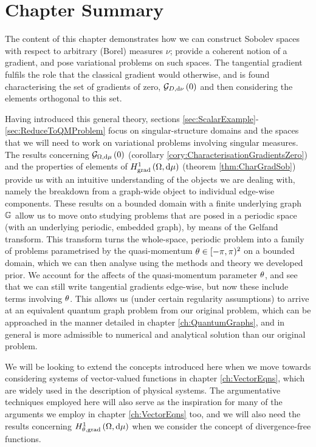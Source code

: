 \section{Chapter Summary}
The content of this chapter demonstrates how we can construct Sobolev spaces with respect to arbitrary (Borel) measures $\nu$; provide a coherent notion of a gradient, and pose variational problems on such spaces.
The tangential gradient fulfils the role that the classical gradient would otherwise, and is found characterising the set of gradients of zero, $\mathcal{G}_{ D, \mathrm{d}\nu}\left( 0 \right)$ and then considering the elements orthogonal to this set. \newline

Having introduced this general theory, sections \ref{sec:ScalarExample}-\ref{sec:ReduceToQMProblem} focus on singular-structure domains and the spaces that we will need to work on variational problems involving singular measures.
The results concerning $\mathcal{G}_{ \Omega, \mathrm{d}\mu}\left( 0 \right)$ (corollary \ref{cory:CharacterisationGradientsZero}) and the properties of elements of $H^1_\mathrm{grad}\left( \Omega, \mathrm{d}\mu \right)$ (theorem \ref{thm:CharGradSob}) provide us with an intuitive understanding of the objects we are dealing with, namely the breakdown from a graph-wide object to individual edge-wise components.
These results on a bounded domain with a finite underlying graph $\mathbb{G}$ allow us to move onto studying problems that are posed in a periodic space (with an underlying periodic, embedded graph), by means of the Gelfand transform.
This transform turns the whole-space, periodic problem into a family of problems parametrised by the quasi-momentum $\theta\in[-\pi,\pi)^2$ on a bounded domain, which we can then analyse using the methods and theory we developed prior.
We account for the affects of the quasi-momentum parameter $\theta$, and see that we can still write tangential gradients edge-wise, but now these include terms involving $\theta$.
This allows us (under certain regularity assumptions) to arrive at an equivalent quantum graph problem from our original problem, which can be approached in the manner detailed in chapter \ref{ch:QuantumGraphs}, and in general is more admissible to numerical and analytical solution than our original problem. \newline

We will be looking to extend the concepts introduced here when we move towards considering systems of vector-valued functions in chapter \ref{ch:VectorEqns}, which are widely used in the description of physical systems.
The argumentative techniques employed here will also serve as the inspiration for many of the arguments we employ in chapter \ref{ch:VectorEqns} too, and we will also need the results concerning $H^1_{\theta, \mathrm{grad}}\left( \Omega, \mathrm{d}\mu \right)$ when we consider the concept of divergence-free functions.
